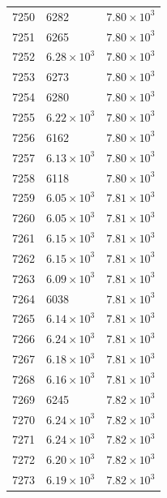 \begin{table}[H]
\begin{tabular}{lll}
7250 & 6282 & $\displaystyle 7.80 \times 10^{3}$ \\
7251 & 6265 & $\displaystyle 7.80 \times 10^{3}$ \\
7252 & $\displaystyle 6.28 \times 10^{3}$ & $\displaystyle 7.80 \times 10^{3}$ \\
7253 & 6273 & $\displaystyle 7.80 \times 10^{3}$ \\
7254 & 6280 & $\displaystyle 7.80 \times 10^{3}$ \\
7255 & $\displaystyle 6.22 \times 10^{3}$ & $\displaystyle 7.80 \times 10^{3}$ \\
7256 & 6162 & $\displaystyle 7.80 \times 10^{3}$ \\
7257 & $\displaystyle 6.13 \times 10^{3}$ & $\displaystyle 7.80 \times 10^{3}$ \\
7258 & 6118 & $\displaystyle 7.80 \times 10^{3}$ \\
7259 & $\displaystyle 6.05 \times 10^{3}$ & $\displaystyle 7.81 \times 10^{3}$ \\
7260 & $\displaystyle 6.05 \times 10^{3}$ & $\displaystyle 7.81 \times 10^{3}$ \\
7261 & $\displaystyle 6.15 \times 10^{3}$ & $\displaystyle 7.81 \times 10^{3}$ \\
7262 & $\displaystyle 6.15 \times 10^{3}$ & $\displaystyle 7.81 \times 10^{3}$ \\
7263 & $\displaystyle 6.09 \times 10^{3}$ & $\displaystyle 7.81 \times 10^{3}$ \\
7264 & 6038 & $\displaystyle 7.81 \times 10^{3}$ \\
7265 & $\displaystyle 6.14 \times 10^{3}$ & $\displaystyle 7.81 \times 10^{3}$ \\
7266 & $\displaystyle 6.24 \times 10^{3}$ & $\displaystyle 7.81 \times 10^{3}$ \\
7267 & $\displaystyle 6.18 \times 10^{3}$ & $\displaystyle 7.81 \times 10^{3}$ \\
7268 & $\displaystyle 6.16 \times 10^{3}$ & $\displaystyle 7.81 \times 10^{3}$ \\
7269 & 6245 & $\displaystyle 7.82 \times 10^{3}$ \\
7270 & $\displaystyle 6.24 \times 10^{3}$ & $\displaystyle 7.82 \times 10^{3}$ \\
7271 & $\displaystyle 6.24 \times 10^{3}$ & $\displaystyle 7.82 \times 10^{3}$ \\
7272 & $\displaystyle 6.20 \times 10^{3}$ & $\displaystyle 7.82 \times 10^{3}$ \\
7273 & $\displaystyle 6.19 \times 10^{3}$ & $\displaystyle 7.82 \times 10^{3}$ \\

\end{tabular}
\end{table}

